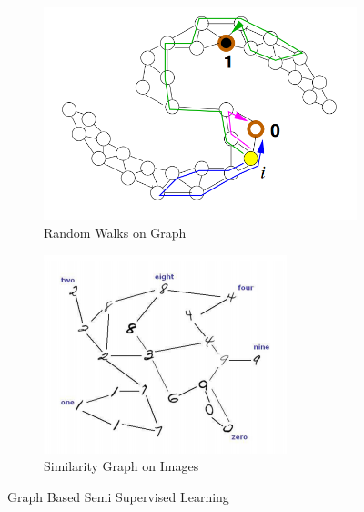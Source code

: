 \begin{figure}[H]
	\centering
	\begin{subfigure}[t]{0.45\linewidth}
		\includegraphics[width=\linewidth]{sections/imgs/techniques/gbssl1.png}
		\caption{Random Walks on Graph\cite{sslZ}}
		\label{fig:random_walk}
	\end{subfigure}
	\begin{subfigure}[t]{0.45\linewidth}
		\includegraphics[width=\linewidth]{sections/imgs/techniques/gbssl2.png}
		\caption{Similarity Graph on Images\cite{ssl1}}
		\label{fig:similarity_Graph_on_images}
	\end{subfigure}
	
	\caption{Graph Based Semi Supervised Learning}
	\label{fig:gbssl}

\end{figure}

